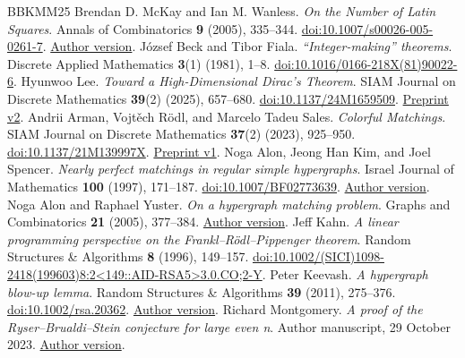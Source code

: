 \documentclass[11pt,a4paper]{article}
\begin{document}
\begin{thebibliography}{BBKMM25}
Brendan D. McKay and Ian M. Wanless. \emph{On the Number of Latin Squares}. Annals of Combinatorics \textbf{9} (2005), 335--344. \href{https://doi.org/10.1007/s00026-005-0261-7}{doi:10.1007/s00026-005-0261-7}. \href{https://users.monash.edu.au/~iwanless/papers/LS11AC.pdf}{Author version}.
József Beck and Tibor Fiala. \emph{``Integer-making'' theorems}. Discrete Applied Mathematics \textbf{3}(1) (1981), 1--8. \href{https://doi.org/10.1016/0166-218X\%2881\%2990022-6}{doi:10.1016/0166-218X(81)90022-6}.
Hyunwoo Lee. \emph{Toward a High-Dimensional Dirac's Theorem}. SIAM Journal on Discrete Mathematics \textbf{39}(2) (2025), 657--680. \href{https://doi.org/10.1137/24M1659509}{doi:10.1137/24M1659509}. \href{https://arxiv.org/html/2310.15909v2}{Preprint v2}.
Andrii Arman, Vojtěch Rödl, and Marcelo Tadeu Sales. \emph{Colorful Matchings}. SIAM Journal on Discrete Mathematics \textbf{37}(2) (2023), 925--950. \href{https://doi.org/10.1137/21M139997X}{doi:10.1137/21M139997X}. \href{https://arxiv.org/html/2102.09633v1}{Preprint v1}.
Noga Alon, Jeong Han Kim, and Joel Spencer. \emph{Nearly perfect matchings in regular simple hypergraphs}. Israel Journal of Mathematics \textbf{100} (1997), 171--187. \href{https://doi.org/10.1007/BF02773639}{doi:10.1007/BF02773639}. \href{https://tau.ac.il/~nogaa/PDFS/aks7.pdf}{Author version}.
Noga Alon and Raphael Yuster. \emph{On a hypergraph matching problem}. Graphs and Combinatorics \textbf{21} (2005), 377--384. \href{https://web.math.princeton.edu/~nalon/PDFS/ayhyper2.pdf}{Author version}.
Jeff Kahn. \emph{A linear programming perspective on the Frankl--Rödl--Pippenger theorem}. Random Structures \& Algorithms \textbf{8} (1996), 149--157. \href{https://onlinelibrary.wiley.com/doi/abs/10.1002/\%28SICI\%291098-2418\%28199603\%298\%3A2\%3C149\%3A\%3AAID-RSA5\%3E3.0.CO\%3B2-Y}{doi:10.1002/(SICI)1098-2418(199603)8:2\textless149::AID-RSA5\textgreater3.0.CO;2-Y}.
Peter Keevash. \emph{A hypergraph blow-up lemma}. Random Structures \& Algorithms \textbf{39} (2011), 275--376. \href{https://doi.org/10.1002/rsa.20362}{doi:10.1002/rsa.20362}. \href{https://people.maths.ox.ac.uk/keevash/papers/hyp-blowup-journal.pdf}{Author version}.
Richard Montgomery. \emph{A proof of the Ryser--Brualdi--Stein conjecture for large even n}. Author manuscript, 29 October 2023. \href{https://rhmontgomery.warwick.ac.uk/papers/30OnRBSconj.pdf}{Author version}.
\end{thebibliography}
\end{document}
